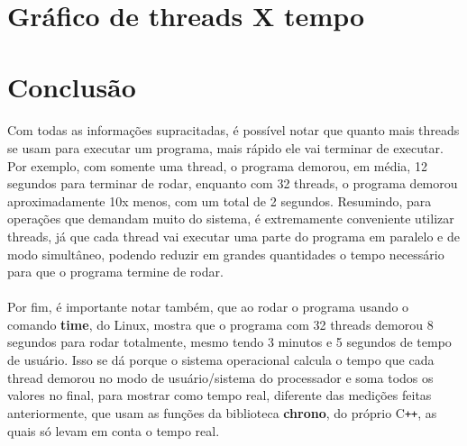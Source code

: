 \documentclass{article}
\begin{document}
\newpage
\clearpage
\section{Gráfico de threads X tempo}

\begin{center}
\end{center}

\section{Conclusão}
\paragraph{}Com todas as informações supracitadas, é possível notar que quanto mais threads se usam para executar um programa, mais rápido ele vai terminar de executar. Por exemplo, com somente uma thread, o programa demorou, em média, 12 segundos para terminar de rodar, enquanto com 32 threads, o programa demorou aproximadamente 10x menos, com um total de 2 segundos. Resumindo, para operações que demandam muito do sistema, é extremamente conveniente utilizar threads, já que cada thread vai executar uma parte do programa em paralelo e de modo simultâneo, podendo reduzir em grandes quantidades o tempo necessário para que o programa termine de rodar.
\paragraph{} Por fim, é importante notar também, que ao rodar o programa usando o comando \textbf{time}, do Linux, mostra que o programa com 32 threads demorou 8 segundos para rodar totalmente, mesmo tendo 3 minutos e 5 segundos de tempo de usuário. Isso se dá porque o sistema operacional calcula o tempo que cada thread demorou no modo de usuário/sistema do processador e soma todos os valores no final, para mostrar como tempo real, diferente das medições feitas anteriormente, que usam as funções da biblioteca \textbf{chrono}, do próprio C\texttt{++}, as quais só levam em conta o tempo real.
\end{document}
